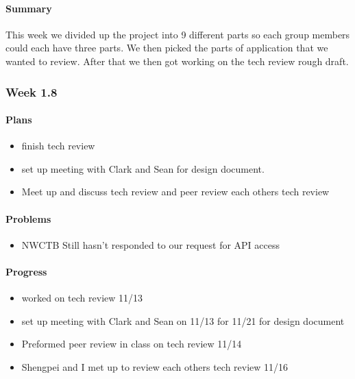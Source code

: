 \documentclass[onecolumn, draftclsnofoot,10pt, compsoc]{article}
\begin{document}
		    \paragraph{Summary} \hfill \break
		        This week we divided up the project into 9 different parts so each group members could each have three parts. We then picked the parts of application that we wanted to review. After that we then got working on the tech review rough draft.\\
		
		\subsubsection{Week 1.8}
		
			\paragraph{Plans} \hfill \break
			    \begin{itemize}
			        \item finish tech review
			        \item set up meeting with Clark and Sean for design document.
			        \item Meet up and discuss tech review and peer review each others tech review
			    \end{itemize}
		
		    \paragraph{Problems} \hfill \break
		        \begin{itemize}
		            \item NWCTB Still hasn't responded to our request for API access
		        \end{itemize}
		
		    \paragraph{Progress} \hfill \break
		        \begin{itemize}
		            \item worked on tech review 11/13
		            \item set up meeting with Clark and Sean on 11/13 for 11/21 for design document
		            \item Preformed peer review in class on tech review 11/14
		            \item Shengpei and I met up to review each others tech review 11/16
		        \end{itemize}
\end{document}
